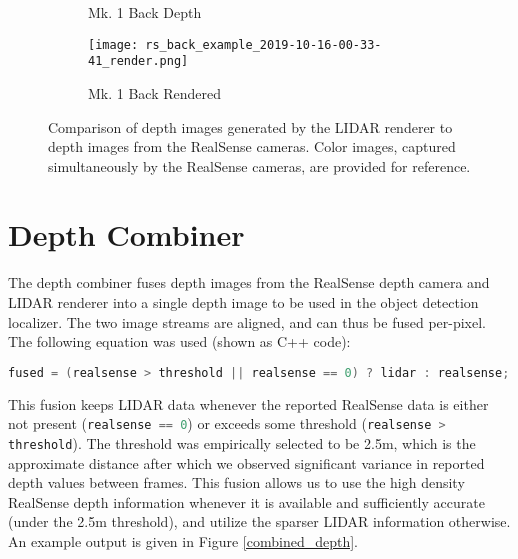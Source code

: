 \begin{figure}
\begin{subfigure}{0.32\textwidth}
		\caption{Mk. 1 Back Depth}
		\label{lidar_back_ref}		
	\end{subfigure}
	\hfill
	\begin{subfigure}{0.32\textwidth}
		\texttt{[image: rs\_back\_example\_2019-10-16-00-33-41\_render.png]}
		\caption{Mk. 1 Back Rendered}
		\label{lidar_back_render}
	\end{subfigure}		
	\caption[LIDAR renderer depth image comparison]{Comparison of depth images generated by the LIDAR renderer to depth images from the RealSense cameras. Color images, captured simultaneously by the RealSense cameras, are provided for reference.}
	\label{lidar_renderer_images}
\end{figure}

\section{Depth Combiner}

The depth combiner fuses depth images from the RealSense depth camera and LIDAR renderer into a single depth image to be used in the object detection localizer. The two image streams are aligned, and can thus be fused per-pixel. The following equation was used (shown as C++ code):

\begin{lstlisting}[language=c++]
fused = (realsense > threshold || realsense == 0) ? lidar : realsense;
\end{lstlisting}

This fusion keeps LIDAR data whenever the reported RealSense data is either not present (\lstinline[language=c++]{realsense == 0}) or exceeds some threshold (\lstinline[language=c++]{realsense > threshold}). The threshold was empirically selected to be 2.5m, which is the approximate distance after which we observed significant variance in reported depth values between frames. This fusion allows us to use the high density RealSense depth information whenever it is available and sufficiently accurate (under the 2.5m threshold), and utilize the sparser LIDAR information otherwise. An example output is given in Figure \ref{combined_depth}.

